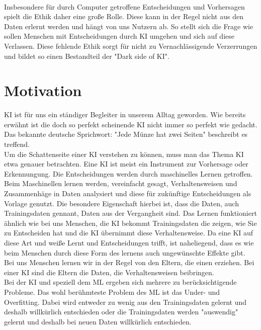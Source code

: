 \begin{onehalfspace}
        \\
        Insbesondere für durch Computer getroffene Entscheidungen und Vorhersagen spielt die Ethik daher eine große Rolle. Diese kann in der Regel nicht aus den Daten erlernt werden und hängt von uns Nutzern ab. So stellt sich die Frage wie sollen Menschen mit Entscheidungen durch \ac*{KI} umgehen und sich auf diese Verlassen. Diese fehlende Ethik sorgt für nicht zu Vernachlässigende Verzerrungen und bildet so einen Bestandteil der "Dark side of KI".

        \newpage
        \section{Motivation}
        \label{subsec:motivation}
        \ac*{KI} ist für uns ein ständiger Begleiter in unserem Alltag geworden. Wie bereits erwähnt ist die doch so perfekt scheinende \ac*{KI} nicht immer so perfekt wie gedacht. Das bekannte deutsche Sprichwort: "Jede Münze hat zwei Seiten" beschreibt es treffend.
        \\
         Um die Schattenseite einer \ac*{KI} verstehen zu können, muss man das Thema \ac*{KI} etwa genauer betrachten. Eine \ac*{KI} ist meist ein Instrument zur Vorhersage oder Erkennungung. Die Entscheidungen werden durch maschinelles Lernen getroffen. Beim Maschinellen lernen werden, vereinfacht gesagt, Verhaltensweisen und Zusammenhäge in Daten analysiert und diese für zukünftige Entscheidungen als Vorlage genutzt. Die besondere Eigenschaft hierbei ist, dass die Daten, auch Trainingsdaten gennant, Daten aus der Vergangheit sind. Das Lernen funktioniert ähnlich wie bei uns Menschen, die \ac*{KI} bekommt Trainingsdaten die zeigen, wie Sie zu Entscheiden hat und die \ac*{KI} übernimmt diese Verhaltensweise. Da eine \ac*{KI} auf diese Art und weiße Lernt und Entscheidungen trifft, ist naheliegend, dass es wie beim Menschen durch diese Form des lernens auch ungewünschte Effekte gibt. Bei uns Menschen lernen wir in der Regel von den Eltern, die einen erziehen. Bei einer \ac*{KI} sind die Eltern die Daten, die Verhaltensweisen beibringen. 
        \\
        Bei der \ac*{KI} und speziell dem \ac*{ML} ergeben sich mehrere zu berücksichtigende Probleme. Das wohl berühmteste Problem des \ac*{ML} ist das Under- und Overfitting. Dabei wird entweder zu wenig aus den Trainingsdaten gelernt und deshalb willkürlich entschieden oder die Trainingsdaten werden "auswendig" gelernt und deshalb bei neuen Daten willkürlich entschieden. 
        \\

\end{onehalfspace}
